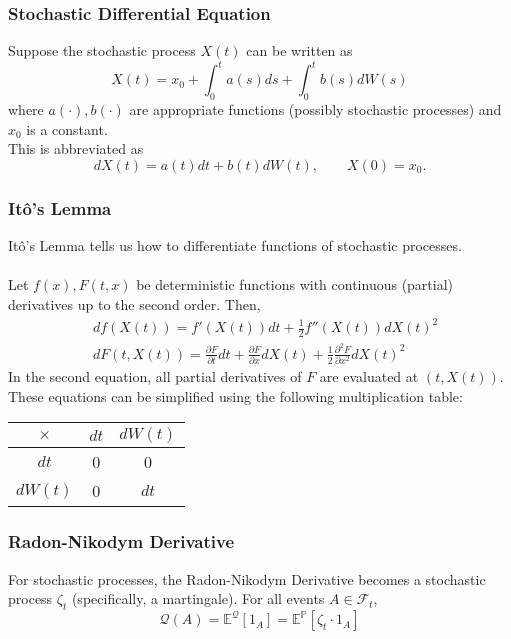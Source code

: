 \documentclass[11pt]{article}
\newcommand{\E}{\mathbb{E}}
\newcommand{\PR}{\mathbb{P}}
\newcommand{\Q}{\mathcal{Q}}
\begin{document}
	\subsubsection{Stochastic Differential Equation}
	Suppose the stochastic process \( X(t) \) can be written as
	\[	X(t) = x_0 + \int_{0}^{t} a(s) ds + \int_{0}^{t} b(s) dW(s)\]
	where \( a(\cdot), b(\cdot) \) are appropriate functions (possibly stochastic processes) and \( x_0 \) is a constant.\\
	This is abbreviated as
	\[	dX(t) = a(t) dt + b(t) dW(t), \qquad X(0) = x_0.\]
	\subsubsection{It\^{o}'s Lemma}
	It\^{o}'s Lemma tells us how to differentiate functions of stochastic processes.
	\\\\Let \( f(x), F(t, x) \) be deterministic functions with continuous (partial) derivatives up to the second order. Then, 
	\begin{align*}
		& df(X(t)) = f'(X(t)) dt + \frac{1}{2}f''(X(t)) dX(t)^2 \\
		& dF(t, X(t)) = \frac{\partial F}{\partial t}dt + \frac{\partial F}{\partial x} dX(t) + \frac{1}{2}\frac{\partial^2 F}{\partial x^2} dX(t)^2
	\end{align*}
	In the second equation, all partial derivatives of \( F \) are evaluated at \( (t, X(t)) \).\\
	These equations can be simplified using the following multiplication table:
	\begin{center}
		\begin{tabular}{ccc}
			\( \times \) & \( dt \) & \( dW(t) \)\\
			\hline
			\hline
			\( dt \) & 0 & 0 \\
			\hline
			\( dW(t) \) & 0 & $dt$ \\
			\hline
			\end{tabular}
		\end{center}
	\subsubsection{Radon-Nikodym Derivative}
	For stochastic processes, the Radon-Nikodym Derivative becomes a stochastic process \( \zeta_t \) (specifically, a martingale). For all events \( A\in\mathcal{F}_t \),
	\[	\Q(A) = \E^{\Q}[1_{A}] = \E^{\PR}[\zeta_t \cdot1_{A}]\]
\end{document}
